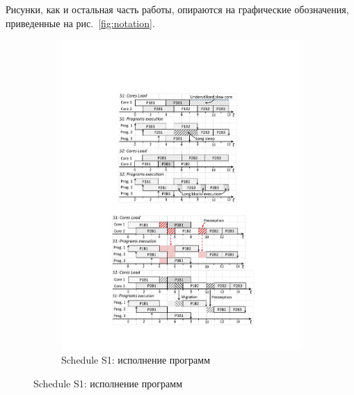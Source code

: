 Рисунки, как и остальная часть работы, опираются на графические обозначения, приведенные на рис.~\ref{fig:notation}.

\begin{figure}
\begin{minipage}{.7\columnwidth}%
\begin{subfigure}{\linewidth}
\includegraphics[width=\linewidth]{figs/s1.pdf}
\caption{Schedule S1: исполнение программ}
\vspace{3mm}
\label{fig:s1}
\end{subfigure}


\end{minipage}
\end{figure}
